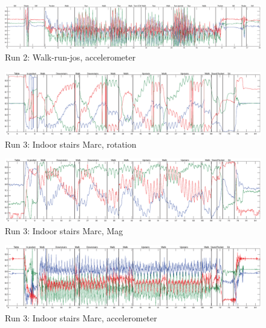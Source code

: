 \begin{figure}
\centering
  \includegraphics[width=1\textwidth]{./Figures/chapter6/data_collection/run-2-walk-run-jos/data_plot_acc_annotated.eps}
  \caption[R2: accelerometer]{Run 2: Walk-run-jos, accelerometer}
  \label{fig:data_gathering_run_2_ann}
\end{figure}

\begin{figure}
\centering
  \includegraphics[width=1\textwidth]{./Figures/chapter6/data_collection/stairs-1-marc/data_plot_rot_annotated.eps}
  \caption[R3: rotation]{Run 3: Indoor stairs Marc, rotation}
  \label{fig:data_gathering_run_3_rot}
\end{figure}

\begin{figure}
\centering
  \includegraphics[width=1\textwidth]{./Figures/chapter6/data_collection/stairs-1-marc/data_plot_mag_annotated.eps}
  \caption[R3: mag]{Run 3: Indoor stairs Marc, Mag}
  \label{fig:data_gathering_run_3_mag}
\end{figure}

\begin{figure}
\centering
  \includegraphics[width=1\textwidth]{./Figures/chapter6/data_collection/stairs-1-marc/data_plot_acc_annotated.eps}
  \caption[R3: accelerometer]{Run 3: Indoor stairs Marc, accelerometer}
  \label{fig:data_gathering_run_3_ann}
\end{figure}

